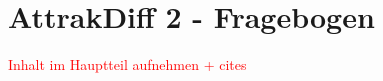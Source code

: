 \section{AttrakDiff 2 - Fragebogen}
\textcolor{red}{Inhalt im Hauptteil aufnehmen + cites} \cite{attrakdiff-2000, attrakdiff-2003, attrakdiff-2008}
